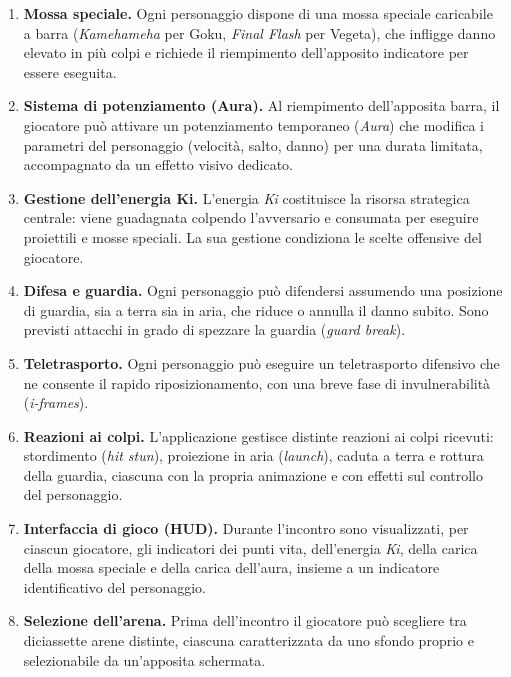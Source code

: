 \documentclass[12pt,a4paper]{report}
\begin{document}
\begin{enumerate}
  \item \textbf{Mossa speciale.} Ogni personaggio dispone di una mossa speciale caricabile a barra (\emph{Kamehameha} per Goku, \emph{Final Flash} per Vegeta), che infligge danno elevato in più colpi e richiede il riempimento dell'apposito indicatore per essere eseguita.

  \item \textbf{Sistema di potenziamento (Aura).} Al riempimento dell'apposita barra, il giocatore può attivare un potenziamento temporaneo (\emph{Aura}) che modifica i parametri del personaggio (velocità, salto, danno) per una durata limitata, accompagnato da un effetto visivo dedicato.

  \item \textbf{Gestione dell'energia Ki.} L'energia \emph{Ki} costituisce la risorsa strategica centrale: viene guadagnata colpendo l'avversario e consumata per eseguire proiettili e mosse speciali. La sua gestione condiziona le scelte offensive del giocatore.

  \item \textbf{Difesa e guardia.} Ogni personaggio può difendersi assumendo una posizione di guardia, sia a terra sia in aria, che riduce o annulla il danno subito. Sono previsti attacchi in grado di spezzare la guardia (\emph{guard break}).

  \item \textbf{Teletrasporto.} Ogni personaggio può eseguire un teletrasporto difensivo che ne consente il rapido riposizionamento, con una breve fase di invulnerabilità (\emph{i-frames}).

  \item \textbf{Reazioni ai colpi.} L'applicazione gestisce distinte reazioni ai colpi ricevuti: stordimento (\emph{hit stun}), proiezione in aria (\emph{launch}), caduta a terra e rottura della guardia, ciascuna con la propria animazione e con effetti sul controllo del personaggio.

  \item \textbf{Interfaccia di gioco (HUD).} Durante l'incontro sono visualizzati, per ciascun giocatore, gli indicatori dei punti vita, dell'energia \emph{Ki}, della carica della mossa speciale e della carica dell'aura, insieme a un indicatore identificativo del personaggio.

  \item \textbf{Selezione dell'arena.} Prima dell'incontro il giocatore può scegliere tra diciassette arene distinte, ciascuna caratterizzata da uno sfondo proprio e selezionabile da un'apposita schermata.


\end{enumerate}
\end{document}
